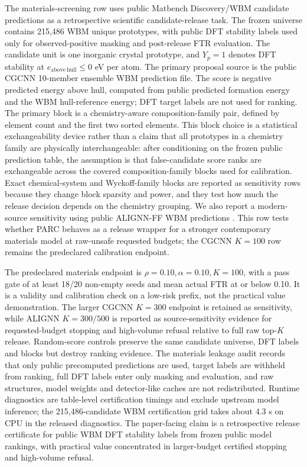 \documentclass[10pt,twocolumn]{article}
\begin{document}
The materials-screening row uses public Matbench Discovery/WBM candidate predictions as a retrospective scientific candidate-release task.
The frozen universe contains 215,486 WBM unique prototypes, with public DFT stability labels used only for observed-positive masking and post-release FTR evaluation.
The candidate unit is one inorganic crystal prototype, and \(Y_p=1\) denotes DFT stability at \(e_{\mathrm{above\ hull}}\le 0\) eV per atom.
The primary proposal source is the public CGCNN 10-member ensemble WBM prediction file.
The score is negative predicted energy above hull, computed from public predicted formation energy and the WBM hull-reference energy; DFT target labels are not used for ranking.
The primary block is a chemistry-aware composition-family pair, defined by element count and the first two sorted elements.
This block choice is a statistical exchangeability device rather than a claim that all prototypes in a chemistry family are physically interchangeable: after conditioning on the frozen public prediction table, the assumption is that false-candidate score ranks are exchangeable across the covered composition-family blocks used for calibration.
Exact chemical-system and Wyckoff-family blocks are reported as sensitivity rows because they change block sparsity and power, and they test how much the release decision depends on the chemistry grouping.
We also report a modern-source sensitivity using public ALIGNN-FF WBM predictions \cite{choudhary2021atomistic}.
This row tests whether PARC behaves as a release wrapper for a stronger contemporary materials model at raw-unsafe requested budgets; the CGCNN \(K=100\) row remains the predeclared calibration endpoint.

The predeclared materials endpoint is \(\rho=0.10,\alpha=0.10,K=100\), with a pass gate of at least 18/20 non-empty seeds and mean actual FTR at or below 0.10.
It is a validity and calibration check on a low-risk prefix, not the practical value demonstration.
The larger CGCNN \(K=300\) endpoint is retained as sensitivity, while ALIGNN \(K=300/500\) is reported as source-sensitivity evidence for requested-budget stopping and high-volume refusal relative to full raw top-\(K\) release.
Random-score controls preserve the same candidate universe, DFT labels and blocks but destroy ranking evidence.
The materials leakage audit records that only public precomputed predictions are used, target labels are withheld from ranking, full DFT labels enter only masking and evaluation, and raw structures, model weights and detector-like caches are not redistributed.
Runtime diagnostics are table-level certification timings and exclude upstream model inference; the 215,486-candidate WBM certification grid takes about 4.3 s on CPU in the released diagnostics.
The paper-facing claim is a retrospective release certificate for public WBM DFT stability labels from frozen public model rankings, with practical value concentrated in larger-budget certified stopping and high-volume refusal.
\end{document}
